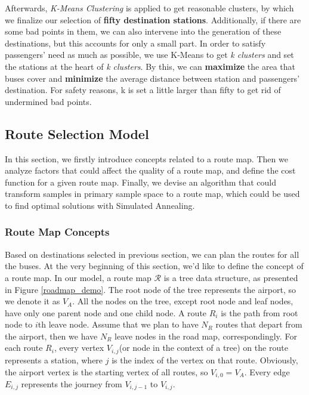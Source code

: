 \documentclass{mcmthesis}
\begin{document}
Afterwards, \emph{K-Means Clustering} is applied to get reasonable clusters, by which we finalize our selection of \textbf{fifty destination stations}. Additionally, if there are some bad points in them, we can also intervene into the generation of these destinations, but this accounts for only a small part.  In order to satisfy passengers' need as much as possible, we use K-Means to get \emph{k clusters} and set the stations at the heart of \emph{k clusters}. By this, we can \textbf{maximize} the area that buses cover and \textbf{minimize} the average distance between station and passengers' destination. For safety reasons, k is set a little larger than fifty to get rid of undermined bad points.

\subsection{Route Selection Model}\label{sec:rout}

In this section, we firstly introduce concepts related to a route map. Then we analyze factors that could affect the quality of a route map, and define the cost function for a given route map. Finally, we devise an algorithm that could transform samples in primary sample space to a route map, which could be used to find optimal solutions with Simulated Annealing.

\subsubsection{Route Map Concepts}
Based on destinations selected in previous section, we can plan the routes for all the buses. At the very beginning of this section, we'd like to define the concept of a route map. In our model, a route map $\mathscr{R}$ is a tree data structure\cite{TreeStructure}, as presented in Figure \ref{roadmap_demo}. The root node of the tree represents the airport, so we denote it as $V_A$. All the nodes on the tree, except root node and leaf nodes, have only one parent node and one child node. A route $R_i$ is the path from root node to $i$th leave node. Assume that we plan to have $N_R$ routes that depart from the airport, then we have $N_R$ leave nodes in the road map, correspondingly. For each route $R_i$, every vertex $V_{i, j}$(or node in the context of a tree) on the route represents a station, where $j$ is the index of the vertex on that route. Obviously, the airport vertex is the starting vertex of all routes, so $V_{i, 0} = V_A$. Every edge $E_{i, j}$ represents the journey from $V_{i, j-1}$ to $V_{i,j}$. 
\end{document}
